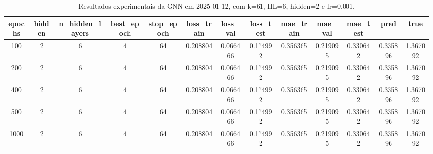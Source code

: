 \begin{table}[h]
\centering
\caption{Resultados experimentais da GNN em 2025-01-12, com k=61, HL=6, hidden=2 e lr=0.001.}
\label{tab:gnn_results_k61_hl6_h2_d20250112}
\begin{tabular}{ccccccccccccc}
\toprule
epochs & hidden & n\_hidden\_layers & best\_epoch & stop\_epoch & loss\_train & loss\_val & loss\_test & mae\_train & mae\_val & mae\_test & pred & true \\
\midrule
100 & 2 & 6 & 4 & 64 & 0.208804 & 0.066466 & 0.174992 & 0.356365 & 0.219095 & 0.330642 & 0.335896 & 1.367092 \\
200 & 2 & 6 & 4 & 64 & 0.208804 & 0.066466 & 0.174992 & 0.356365 & 0.219095 & 0.330642 & 0.335896 & 1.367092 \\
400 & 2 & 6 & 4 & 64 & 0.208804 & 0.066466 & 0.174992 & 0.356365 & 0.219095 & 0.330642 & 0.335896 & 1.367092 \\
500 & 2 & 6 & 4 & 64 & 0.208804 & 0.066466 & 0.174992 & 0.356365 & 0.219095 & 0.330642 & 0.335896 & 1.367092 \\
1000 & 2 & 6 & 4 & 64 & 0.208804 & 0.066466 & 0.174992 & 0.356365 & 0.219095 & 0.330642 & 0.335896 & 1.367092 \\
\bottomrule
\end{tabular}
\end{table}
